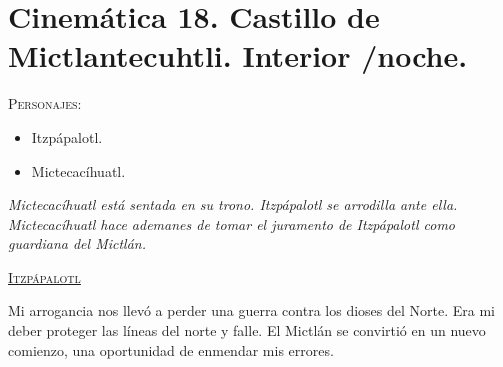 \section{Cinemática 18. Castillo de Mictlantecuhtli. Interior /noche.} \label{Cin:Cinematica18}
\textsc{Personajes}:
\begin{itemize}
	\item Itzpápalotl.
	\item Mictecacíhuatl.
\end{itemize}

\textit{Mictecacíhuatl está sentada en su trono. Itzpápalotl se arrodilla ante ella. Mictecacíhuatl hace ademanes de tomar el juramento de Itzpápalotl como guardiana del Mictlán.}
\begin{center}
\textsc{\underline{Itzpápalotl}}
\\
\par
Mi arrogancia nos llevó a perder una guerra contra los dioses del Norte. Era mi deber proteger las líneas del norte y falle. El Mictlán se convirtió en un nuevo comienzo, una oportunidad de enmendar mis errores.
\end{center}
